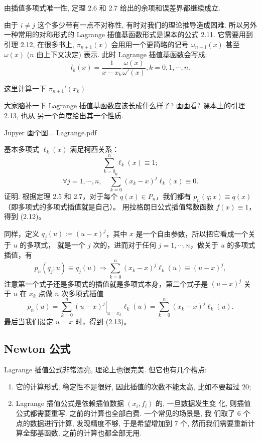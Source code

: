 \documentclass[a4paper]{ctexart}
\newcommand{\remark}[1]
{\noindent {\bf Remark {#1}}}
\begin{document}
由插值多项式唯一性, 定理 2.6 和 2.7 给出的余项和误差界都继续成立.

由于 $i \neq j$ 这个多少带有一点不对称性, 有时对我们的理论推导造成困难.
所以另外一种常用的对称形式的 Lagrange 插值基函数形式是课本的公式 2.11.
它需要用到引理 2.12, 在很多书上, $\pi_{n + 1}(x)$ 会用用一个更简略的记号
$\omega_{n + 1}(x)$ 甚至 $\omega(x)$ ($n$ 由上下文决定) 表示. 此时
Lagrange 插值基函数会写成:
$$
l_k(x) = \frac{1}{x - x_k}\frac{\omega(x)}{\omega'(x)}, k = 0, 1, \cdots, n.
$$

这里计算一下 $\pi_{n + 1}'(x_k)$

大家脑补一下 Lagrange 插值基函数应该长成什么样子? 画画看? 课本上的引理 2.13, 也从
另一个角度给出其一个性质. 

Jupyer 画个图... Lagrange.pdf

 基本多项式 $\ell_k (x)$ 满足柯西关系：
\[
\sum_{k=0}^{n} \ell_k(x) \equiv 1; \tag{2.12}
\]
\[
\forall j = 1, \cdots , n, \quad \sum_{k=0}^{n} (x_k - x)^j \ell_k (x) \equiv 0. \tag{2.13}
\]
证明. 根据定理 2.5 和 2.7，对于每个 $q(x) \in P_n$，我们都有 $p_n (q; x) \equiv q(x)$（即多项式的多项式插值就是自己）。
用拉格朗日公式插值常数函数 $f (x) \equiv 1$，得到 (2.12)。

同样，定义 $q_j (u) := (u - x)^j$，其中 $x$ 是一个自由参数，所以把它看成一个关于 $u$ 的多项式，
就是一个 $j$ 次的，进而对于任何 $j = 1, \cdots , n$，做关于 $u$ 的多项式插值，有
\[
p_n (q_j ; u) \equiv q_j (u) \Rightarrow \sum_{k=0}^{n} (x_k - x)^j \ell_k (u) \equiv (u - x)^j ,
\]
注意第一个式子还是多项式的插值就是多项式本身，第二个式子是 $(u - x)^j$ 关于 $u$ 在 $x_k$ 点做 
$n$ 次多项式插值
\[
  p_n(u) = \sum_{k=0}^{n} \left.(u - x)^j\right|_{u = x_k} \ell_k (u) = \sum_{k=0}^{n} (x_k - x)^j \ell_k (u).
\]
最后当我们设定 $u = x$ 时，得到 (2.13)。


\subsection{Newton 公式}

\remark{2.8} Lagrange 插值公式非常漂亮, 理论上也很完美. 但它也有几个槽点:

\begin{enumerate}
\item 它的计算形式, 稳定性不是很好, 因此插值的次数不能太高, 比如不要超过 $20$;
\item Lagrange 插值公式是依赖插值数据 $(x_i, f_i)$ 的, 一旦数据发生变
  化, 则插值公式都需要重写. 之前的计算也全部白费. 一个常见的场景是, 我
  们取了 $6$ 个点的数据进行计算, 发现精度不够, 于是希望增加到 $7$ 个,
  然而我们需要重新计算全部基函数, 之前的计算也都全部无用. 
\end{enumerate}
\end{document}
